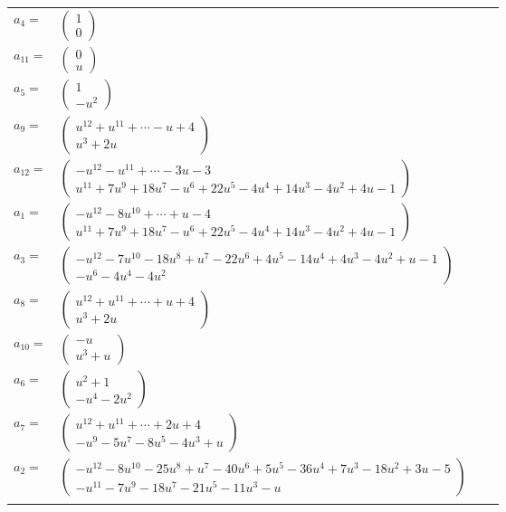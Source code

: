 \documentclass[1p]{elsarticle_modified}
\theoremstyle{definition}
\begin{document}
\begin{tabular}{m{7pt} m{180pt} m{7pt} m{180pt} }
\flushright $a_{4}=$&$\begin{pmatrix}1\\0\end{pmatrix}$ \\
\flushright $a_{11}=$&$\begin{pmatrix}0\\u\end{pmatrix}$ \\
\flushright $a_{5}=$&$\begin{pmatrix}1\\- u^2\end{pmatrix}$ \\
\flushright $a_{9}=$&$\begin{pmatrix}u^{12}+u^{11}+\cdots- u+4\\u^3+2 u\end{pmatrix}$ \\
\flushright $a_{12}=$&$\begin{pmatrix}- u^{12}- u^{11}+\cdots-3 u-3\\u^{11}+7 u^9+18 u^7- u^6+22 u^5-4 u^4+14 u^3-4 u^2+4 u-1\end{pmatrix}$ \\
\flushright $a_{1}=$&$\begin{pmatrix}- u^{12}-8 u^{10}+\cdots+u-4\\u^{11}+7 u^9+18 u^7- u^6+22 u^5-4 u^4+14 u^3-4 u^2+4 u-1\end{pmatrix}$ \\
\flushright $a_{3}=$&$\begin{pmatrix}- u^{12}-7 u^{10}-18 u^8+u^7-22 u^6+4 u^5-14 u^4+4 u^3-4 u^2+u-1\\- u^6-4 u^4-4 u^2\end{pmatrix}$ \\
\flushright $a_{8}=$&$\begin{pmatrix}u^{12}+u^{11}+\cdots+u+4\\u^3+2 u\end{pmatrix}$ \\
\flushright $a_{10}=$&$\begin{pmatrix}- u\\u^3+u\end{pmatrix}$ \\
\flushright $a_{6}=$&$\begin{pmatrix}u^2+1\\- u^4-2 u^2\end{pmatrix}$ \\
\flushright $a_{7}=$&$\begin{pmatrix}u^{12}+u^{11}+\cdots+2 u+4\\- u^9-5 u^7-8 u^5-4 u^3+u\end{pmatrix}$ \\
\flushright $a_{2}=$&$\begin{pmatrix}- u^{12}-8 u^{10}-25 u^8+u^7-40 u^6+5 u^5-36 u^4+7 u^3-18 u^2+3 u-5\\- u^{11}-7 u^9-18 u^7-21 u^5-11 u^3- u\end{pmatrix}$\\&\end{tabular}
\end{document}
